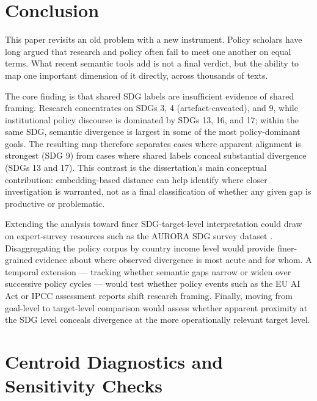 \documentclass[12pt,a4paper]{article}
\begin{document}
\section{Conclusion}
\label{sec:conclusion}

This paper revisits an old problem with a new instrument. Policy scholars have long argued that research and policy often fail to meet one another on equal terms. What recent semantic tools add is not a final verdict, but the ability to map one important dimension of it directly, across thousands of texts.

The core finding is that shared SDG labels are insufficient evidence of shared framing. Research concentrates on SDGs 3, 4 (artefact-caveated), and 9, while institutional policy discourse is dominated by SDGs 13, 16, and 17; within the same SDG, semantic divergence is largest in some of the most policy-dominant goals. The resulting map therefore separates cases where apparent alignment is strongest (SDG 9) from cases where shared labels conceal substantial divergence (SDGs 13 and 17). This contrast is the dissertation's main conceptual contribution: embedding-based distance can help identify where closer investigation is warranted, not as a final classification of whether any given gap is productive or problematic.

Extending the analysis toward finer SDG-target-level interpretation could draw on expert-survey resources such as the AURORA SDG survey dataset \parencite{Aurora2020SDGSurvey}. Disaggregating the policy corpus by country income level would provide finer-grained evidence about where observed divergence is most acute and for whom. A temporal extension --- tracking whether semantic gaps narrow or widen over successive policy cycles --- would test whether policy events such as the EU AI Act or IPCC assessment reports shift research framing. Finally, moving from goal-level to target-level comparison would assess whether apparent proximity at the SDG level conceals divergence at the more operationally relevant target level.

\printbibliography

\clearpage
\appendix
\section{Centroid Diagnostics and Sensitivity Checks}
\label{app:centroid-diagnostics}
\end{document}
